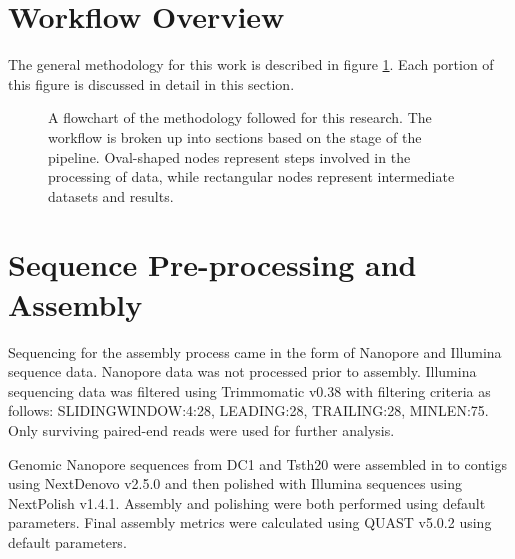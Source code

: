 \section{Workflow Overview}

The general methodology for this work is described in figure
\ref{fig:workflow}. Each portion of this figure is discussed in detail
in this section.

\begin{figure}
  \centering
  \caption{A flowchart of the methodology followed for this
    research. The workflow is broken up into sections based on the
    stage of the pipeline. Oval-shaped nodes represent steps
    involved in the processing of data, while rectangular nodes
    represent intermediate datasets and results.}
  \label{fig:workflow}
\end{figure}


\section{Sequence Pre-processing and Assembly}

Sequencing for the assembly process came in the form of Nanopore and
Illumina sequence data. Nanopore data was not processed prior to
assembly. Illumina sequencing data was filtered using Trimmomatic
v0.38\cite{Bolger2014} with filtering criteria as follows:
SLIDINGWINDOW:4:28, LEADING:28, TRAILING:28, MINLEN:75. Only surviving
paired-end reads were used for further analysis.

Genomic Nanopore sequences from DC1 and Tsth20 were assembled in to
contigs using NextDenovo\cite{Hu2024} v2.5.0 and then polished with
Illumina sequences using NextPolish\cite{Hu2020} v1.4.1. Assembly and
polishing were both performed using default parameters. Final assembly
metrics were calculated using QUAST v5.0.2\cite{Gurevich2013} using
default parameters.

